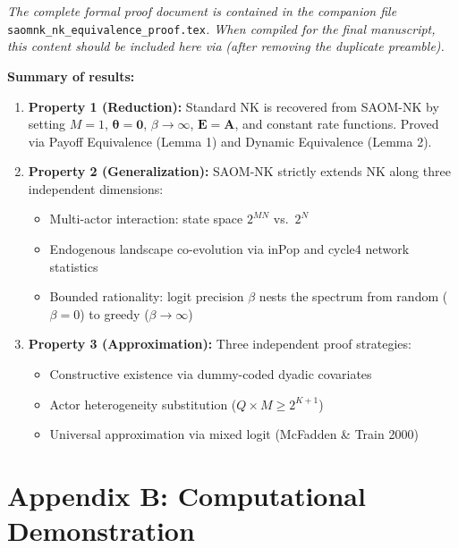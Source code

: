 \documentclass[12pt]{article}
\begin{document}
\noindent\textit{The complete formal proof document is contained in the
companion file} \texttt{saomnk\_nk\_equivalence\_proof.tex}\textit{.
When compiled for the final manuscript, this content should be included
here via} \verb|| \textit{(after
removing the duplicate preamble).}

\bigskip\noindent
\textbf{Summary of results:}

\begin{enumerate}
  \item \textbf{Property 1 (Reduction):} Standard NK is recovered from
    SAOM-NK by setting $M=1$, $\boldsymbol{\theta}=\mathbf{0}$,
    $\beta\to\infty$, $\mathbf{E}=\mathbf{A}$, and constant rate functions.
    Proved via Payoff Equivalence (Lemma 1) and Dynamic Equivalence (Lemma 2).

  \item \textbf{Property 2 (Generalization):} SAOM-NK strictly extends NK
    along three independent dimensions:
    \begin{itemize}
      \item[(a)] Multi-actor interaction: state space $2^{MN}$ vs.\ $2^N$
      \item[(b)] Endogenous landscape co-evolution via inPop and cycle4
            network statistics
      \item[(c)] Bounded rationality: logit precision $\beta$ nests the
            spectrum from random ($\beta=0$) to greedy ($\beta\to\infty$)
    \end{itemize}

  \item \textbf{Property 3 (Approximation):} Three independent proof
    strategies:
    \begin{itemize}
      \item[3a.] Constructive existence via dummy-coded dyadic covariates
      \item[3b.] Actor heterogeneity substitution ($Q \times M \geq 2^{K+1}$)
      \item[3c.] Universal approximation via mixed logit (McFadden \& Train 2000)
    \end{itemize}
\end{enumerate}



\newpage
\part*{Appendix B: Computational Demonstration}
\end{document}
